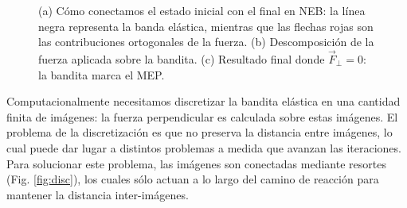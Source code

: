 \begin{figure}[H]
        \caption{(a) Cómo conectamos el estado inicial con el final en NEB: la línea negra representa la banda elástica, mientras que las flechas rojas son las contribuciones ortogonales de la fuerza. (b) Descomposición de la fuerza aplicada sobre la bandita. (c) Resultado final donde $\vec{F}_{\perp} = 0$: la bandita marca el MEP.}
        \label{fig:NEB}
    \end{figure}

  Computacionalmente necesitamos discretizar la bandita elástica en una cantidad finita de imágenes: la fuerza perpendicular es calculada sobre estas imágenes. El problema de la discretización es que no preserva la distancia entre imágenes, lo cual puede dar lugar a distintos problemas a medida que avanzan las iteraciones. Para solucionar este problema, las imágenes son conectadas mediante resortes (Fig. \ref{fig:disc}), los cuales sólo actuan a lo largo del camino de reacción para mantener la distancia inter-imágenes.

